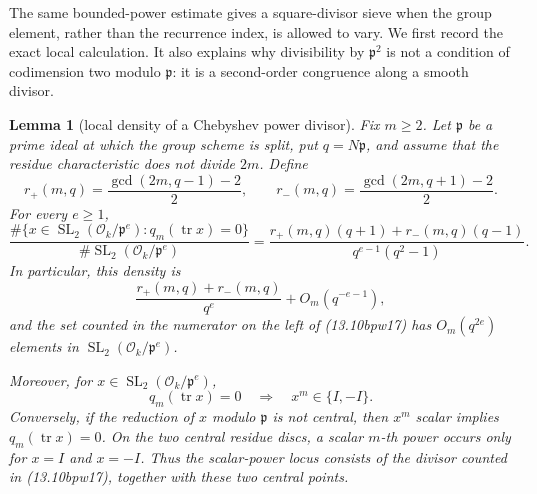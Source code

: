 \documentclass[11pt,reqno]{amsart}
\newtheorem{lemma}[theorem]{Lemma}
\theoremstyle{definition}
\theoremstyle{remark}
\newcommand{\cO}{\mathcal O}
\newcommand{\Tr}{\operatorname{tr}}
\newcommand{\SL}{\operatorname{SL}}
\begin{document}
The same bounded-power estimate gives a square-divisor sieve when the group
element, rather than the recurrence index, is allowed to vary.  We first
record the exact local calculation.  It also explains why divisibility by
\(\mathfrak p^2\) is not a condition of codimension two modulo
\(\mathfrak p\): it is a second-order congruence along a smooth divisor.

\begin{lemma}[local density of a Chebyshev power divisor]
\label{lem:chebyshev-local-power-density}
Fix \(m\ge2\).  Let \(\mathfrak p\) be a prime ideal at which the group
scheme is split, put \(q=N\mathfrak p\), and assume that the residue
characteristic does not divide \(2m\).  Define
\[
 r_+(m,q)=\frac{\gcd(2m,q-1)-2}{2},\qquad
 r_-(m,q)=\frac{\gcd(2m,q+1)-2}{2}.
\tag{13.10bpw16}
\]
For every \(e\ge1\),
\[
 \frac{\#\{x\in\SL_2(\cO_k/\mathfrak p^e):
                  q_m(\Tr x)=0\}}
      {\#\SL_2(\cO_k/\mathfrak p^e)}
 =\frac{r_+(m,q)(q+1)+r_-(m,q)(q-1)}
        {q^{e-1}(q^2-1)}.
\tag{13.10bpw17}
\]
In particular, this density is
\[
 \frac{r_+(m,q)+r_-(m,q)}{q^e}+O_m(q^{-e-1}),
\tag{13.10bpw18}
\]
and the set counted in the numerator on the left of (13.10bpw17) has
\(O_m(q^{2e})\) elements in
\(\SL_2(\cO_k/\mathfrak p^e)\).

Moreover, for \(x\in\SL_2(\cO_k/\mathfrak p^e)\),
\[
 q_m(\Tr x)=0\quad\Longrightarrow\quad x^m\in\{I,-I\}.
\tag{13.10bpw19}
\]
Conversely, if the reduction of \(x\) modulo \(\mathfrak p\) is not
central, then \(x^m\) scalar implies \(q_m(\Tr x)=0\).  On the two central
residue discs, a scalar \(m\)-th power occurs only for \(x=I\) and
\(x=-I\).  Thus the scalar-power locus consists of the divisor counted in
(13.10bpw17), together with these two central points.
\end{lemma}
\end{document}
